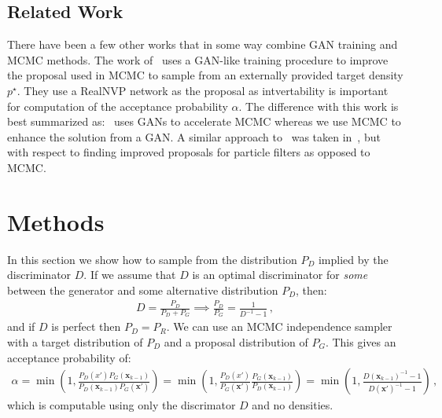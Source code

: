 \documentclass{article}
\renewcommand{\vec}[1]{{\boldsymbol{\mathbf{#1}}}} %
\newcommand{\target}{{p^\star}}
\begin{document}
\subsection{Related Work}

There have been a few other works that in some way combine GAN training and MCMC methods.
The work of~\citet{} uses a GAN-like training procedure to improve the proposal used in MCMC to sample from an externally provided target density $\target$.
They use a RealNVP network as the proposal as intvertability is important for computation of the acceptance probability $\alpha$.
The difference with this work is best summarized as:~\citet{} uses GANs to accelerate MCMC whereas we use MCMC to enhance the solution from a GAN\@.
A similar approach to~\citet{} was taken in~\citet{}, but with respect to finding improved proposals for particle filters as opposed to MCMC\@.

\section{Methods}

In this section we show how to sample from the distribution $P_D$ implied by the discriminator $D$.
If we assume that $D$ is an optimal discriminator for \emph{some} between the generator and some alternative distribution $P_D$, then:
\begin{align}
  D = \frac{P_D}{P_D + P_G} \implies \frac{P_D}{P_G} = \frac{1}{D^{-1}-1}\,, \label{eq:PD def}
\end{align}
and if $D$ is perfect then $P_D = P_R$.
We can use an MCMC independence sampler with a target distribution of $P_D$ and a proposal distribution of $P_G$.
This gives an acceptance probability of:
\begin{align}
  \alpha = \min\left(1, \frac{P_D(x')P_G(\vec x_{k-1})}{P_D(\vec x_{k-1})P_G(\vec x')}\right)
    = \min\left(1, \frac{P_D(x')}{P_G(\vec x')} \frac{P_G(\vec x_{k-1})}{P_D(\vec x_{k-1})}\right)
    = \min\left(1, \frac{D(\vec x_{k-1})^{-1} - 1}{D(\vec x')^{-1} - 1}\right)\,, \label{eq:alpha from D}
\end{align}
which is computable using only the discrimator $D$ and no densities.
\end{document}
